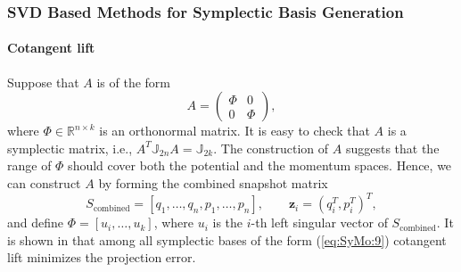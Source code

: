 \subsubsection{SVD Based Methods for Symplectic Basis Generation} \label{chap:SyMo.PrSy:2} 


\paragraph{\bf Cotangent lift} Suppose that $A$ is of the form
\begin{equation} \label{eq:SyMo:9}
	A = 
	\begin{pmatrix}
		\Phi & 0 \\
		0 & \Phi
	\end{pmatrix},
\end{equation}
where $\Phi \in \mathbb{R}^{n\times k}$ is an orthonormal matrix. It is easy to check that $A$ is a symplectic matrix, i.e., $A^T \mathbb J_{2n} A = \mathbb J_{2k}$. The construction of $A$ suggests that the range of $\Phi$ should cover both the potential and the momentum spaces. Hence, we can construct $A$ by forming the combined snapshot matrix
\begin{equation} \label{eq:SyMo:10}
	S_{\text{combined}} = [q_1,\dots,q_n,p_1,\dots,p_n], \qquad \mathbf z_i = (q_i^T,p_i^T)^T,
\end{equation}
and define $\Phi=[u_i,\dots,u_k]$, where $u_i$ is the $i$-th left singular vector of $S_{\text{combined}}$. It is shown in \cite{Peng:2014di} that among all symplectic bases of the form (\ref{eq:SyMo:9}) cotangent lift minimizes the projection error.


%
%

